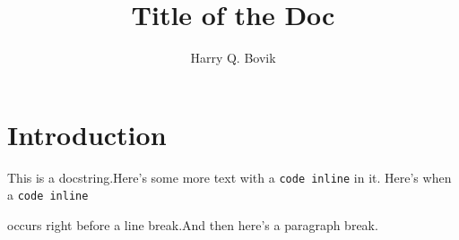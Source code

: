 \documentclass{memoir}
\title{\sffamily Title of the Doc}
\author{\sffamily Harry Q. Bovik}
\date{\sffamily }
\begin{document}
\frontmatter

\begin{titlingpage}
\maketitle
\end{titlingpage}

\tableofcontents

\mainmatter

\chapter*{Introduction}
This is a docstring.Here's some more text with a \Verb|code inline|
 in it.
Here's when a \Verb|code inline|

occurs right before a line break.And then here's a paragraph break.
\end{document}
